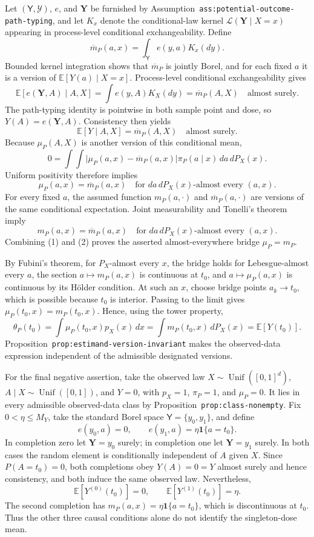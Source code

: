 Let \((\mathsf Y,\mathcal Y)\), \(e\), and \(\mathbf Y\) be furnished by Assumption~\texttt{ass:potential-outcome-path-typing}, and let \(K_x\) denote the conditional-law kernel \(\mathcal L(\mathbf Y\mid X=x)\) appearing in process-level conditional exchangeability. Define
\[
\overline m_P(a,x)=\int_{\mathsf Y}e(y,a)K_x(dy).
\]
Bounded kernel integration shows that \(\overline m_P\) is jointly Borel, and for each fixed \(a\) it is a version of \(\mathbb E[Y(a)\mid X=x]\). Process-level conditional exchangeability gives
\[
\mathbb E[e(\mathbf Y,A)\mid A,X]
=
\int e(y,A)K_X(dy)
=
\overline m_P(A,X)
\quad\text{almost surely}.
\]
The path-typing identity is pointwise in both sample point and dose, so \(Y(A)=e(\mathbf Y,A)\). Consistency then yields
\[
\mathbb E[Y\mid A,X]=\overline m_P(A,X)
\quad\text{almost surely}.
\]
Because \(\mu_P(A,X)\) is another version of this conditional mean,
\[
0=\int\!\int
\lvert\mu_P(a,x)-\overline m_P(a,x)\rvert
\pi_P(a\mid x)\,da\,dP_X(x).
\]
Uniform positivity therefore implies
\[
\mu_P(a,x)=\overline m_P(a,x)
\quad\text{for }da\,dP_X(x)\text{-almost every }(a,x). \tag{1}
\]
For every fixed \(a\), the assumed function \(m_P(a,\cdot)\) and \(\overline m_P(a,\cdot)\) are versions of the same conditional expectation. Joint measurability and Tonelli's theorem imply
\[
m_P(a,x)=\overline m_P(a,x)
\quad\text{for }da\,dP_X(x)\text{-almost every }(a,x). \tag{2}
\]
Combining (1) and (2) proves the asserted almost-everywhere bridge \(\mu_P=m_P\).

By Fubini's theorem, for \(P_X\)-almost every \(x\), the bridge holds for Lebesgue-almost every \(a\), the section \(a\mapsto m_P(a,x)\) is continuous at \(t_0\), and \(a\mapsto\mu_P(a,x)\) is continuous by its Hölder condition. At such an \(x\), choose bridge points \(a_k\to t_0\), which is possible because \(t_0\) is interior. Passing to the limit gives \(\mu_P(t_0,x)=m_P(t_0,x)\). Hence, using the tower property,
\[
\theta_P(t_0)
=
\int\mu_P(t_0,x)p_X(x)\,dx
=
\int m_P(t_0,x)\,dP_X(x)
=
\mathbb E[Y(t_0)].
\]
Proposition~\texttt{prop:estimand-version-invariant} makes the observed-data expression independent of the admissible designated versions.

For the final negative assertion, take the observed law \(X\sim\operatorname{Unif}([0,1]^d)\), \(A\mid X\sim\operatorname{Unif}([0,1])\), and \(Y=0\), with \(p_X=1\), \(\pi_P=1\), and \(\mu_P=0\). It lies in every admissible observed-data class by Proposition~\texttt{prop:class-nonempty}. Fix \(0<\eta\le M_Y\), take the standard Borel space \(\mathsf Y=\{y_0,y_1\}\), and define
\[
e(y_0,a)=0,
\qquad
e(y_1,a)=\eta\mathbf 1\{a=t_0\}.
\]
In completion zero let \(\mathbf Y=y_0\) surely; in completion one let \(\mathbf Y=y_1\) surely. In both cases the random element is conditionally independent of \(A\) given \(X\). Since \(P(A=t_0)=0\), both completions obey \(Y(A)=0=Y\) almost surely and hence consistency, and both induce the same observed law. Nevertheless,
\[
\mathbb E[Y^{(0)}(t_0)]=0,
\qquad
\mathbb E[Y^{(1)}(t_0)]=\eta.
\]
The second completion has \(m_P(a,x)=\eta\mathbf 1\{a=t_0\}\), which is discontinuous at \(t_0\). Thus the other three causal conditions alone do not identify the singleton-dose mean.